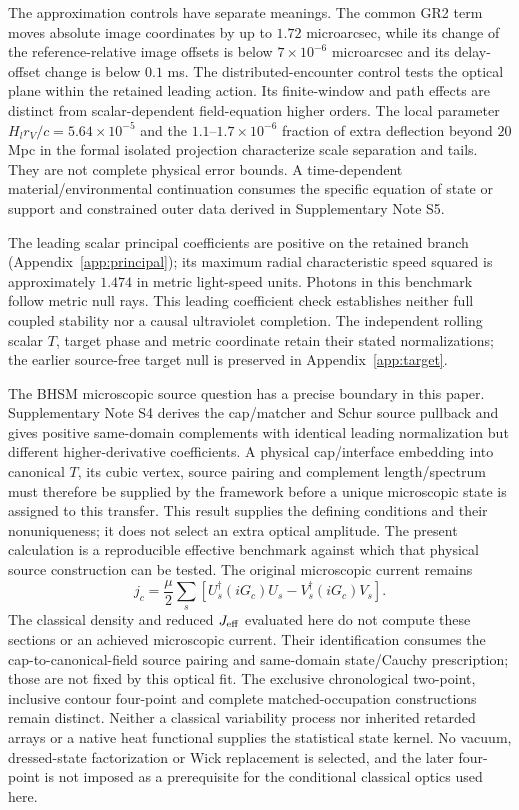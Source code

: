 The approximation controls have separate meanings. The common GR2 term
moves absolute image coordinates by up to $1.72$ microarcsec, while its
change of the reference-relative image offsets is below
$7\times10^{-6}$ microarcsec and its delay-offset change is below
$0.1$ ms. The distributed-encounter control tests the optical plane
within the retained leading action. Its finite-window and path effects
are distinct from scalar-dependent field-equation higher orders.
The local parameter $H_lr_V/c=5.64\times10^{-5}$ and the
$1.1$--$1.7\times10^{-6}$ fraction of extra deflection beyond $20$ Mpc
in the formal isolated projection characterize scale separation and
tails. They are not complete physical error bounds. A time-dependent
material/environmental continuation consumes the specific equation of
state or support and constrained outer data derived in Supplementary
Note S5.

The leading scalar principal coefficients are positive on the retained
branch (Appendix~\ref{app:principal}); its maximum radial characteristic
speed squared is approximately $1.474$ in metric light-speed units.
Photons in this benchmark follow metric null rays. This leading
coefficient check establishes neither full coupled stability nor a
causal ultraviolet completion. The independent rolling scalar $T$,
target phase and metric coordinate retain their stated normalizations;
the earlier source-free target null is preserved in Appendix~\ref{app:target}.

The BHSM microscopic source question has a precise boundary in this
paper. Supplementary Note S4 derives the cap/matcher and Schur source
pullback and gives positive same-domain complements with identical
leading normalization but different higher-derivative coefficients.
A physical cap/interface embedding into canonical $T$, its cubic
vertex, source pairing and complement length/spectrum must therefore
be supplied by the framework before a unique microscopic state is
assigned to this transfer. This result supplies the defining conditions
and their nonuniqueness; it does not select an extra optical amplitude.
The present calculation is a reproducible effective benchmark against
which that physical source construction can be tested.
The original microscopic current remains
\begin{equation}
 j_c=\frac{\mu}{2}\sum_s\left[
 U_s^\dagger(iG_c)U_s-V_s^\dagger(iG_c)V_s\right].
 \label{eq:he0435-microscopic-current-scope}
\end{equation}
The classical density and reduced $J_{\rm eff}$ evaluated here do not
compute these sections or an achieved microscopic current. Their
identification consumes the cap-to-canonical-field source pairing and
same-domain state/Cauchy prescription; those are not fixed by this
optical fit. The exclusive chronological two-point, inclusive contour
four-point and complete matched-occupation constructions remain distinct.
Neither a classical variability process nor inherited retarded arrays
or a native heat functional supplies the statistical state kernel.
No vacuum, dressed-state factorization or Wick replacement is selected,
and the later four-point is not imposed as a prerequisite for the
conditional classical optics used here.


